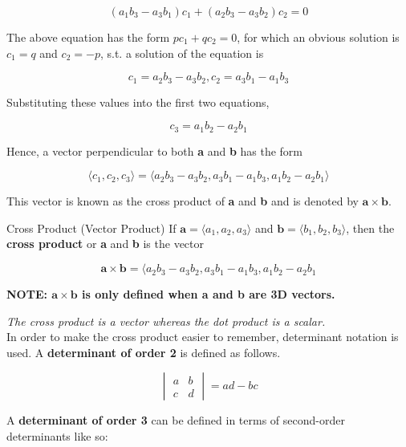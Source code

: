         \[
            (a_1 b_3 - a_3 b_1 )c_1 + (a_2 b_3 - a_3 b_2) c_2 = 0
        \]

        The above equation has the form $pc_1 + qc_2 = 0$, for which an obvious solution is $c_1 = q$ and $c_2 = -p$, s.t. a solution of the equation is

        \[
            c_1 = a_2 b_3 - a_3 b_2, c_2 = a_3 b_1 - a_1 b_3
        \]

        Substituting these values into the first two equations,

        \[
            c_3 = a_1 b_2 - a_2 b_1
        \]

        Hence, a vector perpendicular to both \textbf{a} and \textbf{b} has the form

        \[
            \langle c_1, c_2, c_3\rangle = \langle a_2 b_3 - a_3 b_2, a_3 b_1 - a_1 b_3, a_1 b_2 - a_2 b_1\rangle
        \]

        This vector is known as the cross product of \textbf{a} and \textbf{b} and is denoted by $\mathbf{a \times b}$.

        \begin{axiom}{Cross Product (Vector Product)}
            If $\mathbf{a} = \langle a_1, a_2, a_3 \rangle$ and $\mathbf{b} = \langle b_1, b_2, b_3 \rangle$, then the \textbf{cross product} or \textbf{a} and \textbf{b} is the vector

            \[
                \mathbf{a \times b} = \langle a_2 b_3 - a_3 b_2, a_3 b_1 - a_1 b_3, a_1 b_2 - a_2 b_1
            \]

            \textbf{NOTE: $\mathbf{a\times b}$ is only defined when a and b are 3D vectors.}
        \end{axiom}

        \textit{The cross product is a vector whereas the dot product is a scalar.} \\

        In order to make the cross product easier to remember, determinant notation is used. A \textbf{determinant of order 2} is defined as follows.

        \[
            \begin{vmatrix}
                a   & b \\
                c   & d
            \end{vmatrix}
            = ad - bc
        \]

        A \textbf{determinant of order 3} can be defined in terms of second-order determinants like so:


